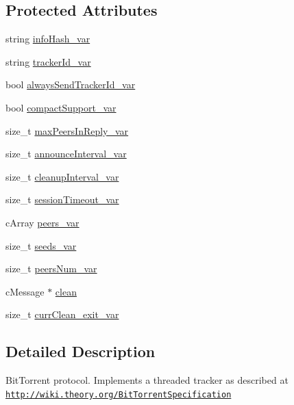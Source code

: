 \subsection*{Protected Attributes}
\begin{DoxyCompactItemize}
\item 
string \hyperlink{classBTTrackerBase_a6164025eda001522313b120b94cf1049}{info\+Hash\+\_\+var}
\item 
string \hyperlink{classBTTrackerBase_adf43f3c801c6904772843b85bc6d2c13}{tracker\+Id\+\_\+var}
\item 
bool \hyperlink{classBTTrackerBase_aa627eb44986bdbbbd1afa58900c2d0f7}{always\+Send\+Tracker\+Id\+\_\+var}
\item 
bool \hyperlink{classBTTrackerBase_aeb6d8973fe084f768e436a8ce5da35d7}{compact\+Support\+\_\+var}
\item 
size\+\_\+t \hyperlink{classBTTrackerBase_ad4b07408463db605eca2706185353107}{max\+Peers\+In\+Reply\+\_\+var}
\item 
size\+\_\+t \hyperlink{classBTTrackerBase_a878a13b70d17fa3e4af1d9548e15c381}{announce\+Interval\+\_\+var}
\item 
size\+\_\+t \hyperlink{classBTTrackerBase_a7b008007cf154ef938d38898b4d25d7c}{cleanup\+Interval\+\_\+var}
\item 
size\+\_\+t \hyperlink{classBTTrackerBase_a1ced4f437ab0e81e1904c17c4e7b3f02}{session\+Timeout\+\_\+var}
\item 
c\+Array \hyperlink{classBTTrackerBase_a7e935c84f601dc0f7f7c51fd7b9bc8bd}{peers\+\_\+var}
\item 
size\+\_\+t \hyperlink{classBTTrackerBase_a4741f78f0b5f6393f6b2634f0fd77109}{seeds\+\_\+var}
\item 
size\+\_\+t \hyperlink{classBTTrackerBase_aa13e59ee55a6ee18af0828fa9e54a01d}{peers\+Num\+\_\+var}
\item 
c\+Message $\ast$ \hyperlink{classBTTrackerBase_a12ea7d9b9e19b425289d8d3197cebae6}{clean}
\item 
size\+\_\+t \hyperlink{classBTTrackerBase_a951142be9da0bbc37937e0f9199af38f}{curr\+Clean\+\_\+exit\+\_\+var}
\end{DoxyCompactItemize}


\subsection{Detailed Description}
Bit\+Torrent protocol. Implements a threaded tracker as described at \href{http://wiki.theory.org/BitTorrentSpecification}{\tt http\+://wiki.\+theory.\+org/\+Bit\+Torrent\+Specification} 

